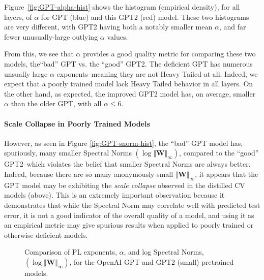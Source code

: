 Figure~\ref{fig:GPT-alpha-hist} shows the histogram (empirical density), for all layers, of $\alpha$ for GPT (blue) and this GPT2 (red) model.  
These two histograms are very different, with GPT2 having both a notably smaller mean $\alpha$, and far fewer unusually-large outlying $\alpha$ values.

From this, we see that $\alpha$ provides a good quality metric for comparing these two models, the``bad'' GPT vs. the ``good'' GPT2.
The deficient GPT has numerous unsually large $\alpha$ exponents--meaning they are not Heavy Tailed at all.
Indeed, we expect that a poorly trained model lack Heavy Tailed behavior in all layers.
On the other hand, as expected, the improved GPT2 model has, on average, smaller $\alpha$ than the older GPT, with all $\alpha\le6$.  


\paragraph{Scale Collapse in Poorly Trained Models}
However, as seen in Figure \ref{fig:GPT-snorm-hist},
the ``bad'' GPT model has, spuriously, many smaller Spectral Norms $(\log\Vert\mathbf{W}\Vert_{\infty})$,
compared to the ``good'' GPT2--which violates the belief that smaller Spectral Norms are always better.
Indeed, because there are so many anonymously small $\Vert\mathbf{W}\Vert_{\infty}$,
it appears that the GPT model may be exhibiting the \emph{scale collapse} observed
in the distilled CV models (above).
This is an extremely important observation because it demonstrates that while the Spectral Norm
may correlate well with predicted test error, it is not a good indicator of the overall quality of a model,
and using it as an empirical metric may give spurious results when applied to poorly trained
or otherwise deficient models. 

\begin{figure}[h]
    \centering
   \caption{Comparison of PL exponents, $\alpha$, and log Spectral Norms, 
$(\log\Vert\mathbf{W}\Vert_{\infty})$, for the OpenAI GPT and GPT2 (small) pretrained models.}
   
\label{fig:GPT-hist}
\end{figure}





